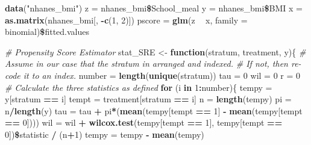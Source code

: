 \documentclass[]{article}
\newenvironment{Shaded}{\begin{snugshade}}{\end{snugshade}}
\newcommand{\KeywordTok}[1]{\textcolor[rgb]{0.13,0.29,0.53}{\textbf{#1}}}
\newcommand{\DataTypeTok}[1]{\textcolor[rgb]{0.13,0.29,0.53}{#1}}
\newcommand{\DecValTok}[1]{\textcolor[rgb]{0.00,0.00,0.81}{#1}}
\newcommand{\StringTok}[1]{\textcolor[rgb]{0.31,0.60,0.02}{#1}}
\newcommand{\CommentTok}[1]{\textcolor[rgb]{0.56,0.35,0.01}{\textit{#1}}}
\newcommand{\ControlFlowTok}[1]{\textcolor[rgb]{0.13,0.29,0.53}{\textbf{#1}}}
\newcommand{\OperatorTok}[1]{\textcolor[rgb]{0.81,0.36,0.00}{\textbf{#1}}}
\newcommand{\NormalTok}[1]{#1}
\begin{document}
\begin{Shaded}
\begin{Highlighting}[]
\KeywordTok{data}\NormalTok{(}\StringTok{"nhanes_bmi"}\NormalTok{)}
\NormalTok{z =}\StringTok{ }\NormalTok{nhanes_bmi}\OperatorTok{\$}\NormalTok{School_meal}
\NormalTok{y =}\StringTok{ }\NormalTok{nhanes_bmi}\OperatorTok{\$}\NormalTok{BMI}
\NormalTok{x =}\StringTok{ }\KeywordTok{as.matrix}\NormalTok{(nhanes_bmi[, }\OperatorTok{-}\KeywordTok{c}\NormalTok{(}\DecValTok{1}\NormalTok{, }\DecValTok{2}\NormalTok{)])}
\NormalTok{pscore =}\StringTok{ }\KeywordTok{glm}\NormalTok{(z }\OperatorTok{~}\StringTok{ }\NormalTok{x, }\DataTypeTok{family =}\NormalTok{ binomial)}\OperatorTok{\$}\NormalTok{fitted.values}

\CommentTok{# Propensity Score Estimator}
\NormalTok{stat_SRE <-}\StringTok{ }\ControlFlowTok{function}\NormalTok{(stratum, treatment, y)\{}
  \CommentTok{# Assume in our case that the stratum in arranged and indexed.}
  \CommentTok{# If not, then re-code it to an index.}
\NormalTok{  number =}\StringTok{ }\KeywordTok{length}\NormalTok{(}\KeywordTok{unique}\NormalTok{(stratum))}
\NormalTok{  tau =}\StringTok{ }\DecValTok{0}
\NormalTok{  wil =}\StringTok{ }\DecValTok{0}
\NormalTok{  r =}\StringTok{ }\DecValTok{0}
  \CommentTok{# Calculate the three statistics as defined}
  \ControlFlowTok{for}\NormalTok{ (i }\ControlFlowTok{in} \DecValTok{1}\OperatorTok{:}\NormalTok{number)\{}
\NormalTok{    tempy =}\StringTok{ }\NormalTok{y[stratum }\OperatorTok{==}\StringTok{ }\NormalTok{i]}
\NormalTok{    tempt =}\StringTok{ }\NormalTok{treatment[stratum }\OperatorTok{==}\StringTok{ }\NormalTok{i]}
\NormalTok{    n =}\StringTok{ }\KeywordTok{length}\NormalTok{(tempy)}
\NormalTok{    pi =}\StringTok{ }\NormalTok{n}\OperatorTok{/}\KeywordTok{length}\NormalTok{(y)}
\NormalTok{    tau =}\StringTok{ }\NormalTok{tau }\OperatorTok{+}\StringTok{ }\NormalTok{pi}\OperatorTok{*}\NormalTok{(}\KeywordTok{mean}\NormalTok{(tempy[tempt }\OperatorTok{==}\StringTok{ }\DecValTok{1}\NormalTok{] }\OperatorTok{-}\StringTok{ }\KeywordTok{mean}\NormalTok{(tempy[tempt }\OperatorTok{==}\StringTok{ }\DecValTok{0}\NormalTok{])))}
\NormalTok{    wil =}\StringTok{ }\NormalTok{wil }\OperatorTok{+}\StringTok{ }\KeywordTok{wilcox.test}\NormalTok{(tempy[tempt }\OperatorTok{==}\StringTok{ }\DecValTok{1}\NormalTok{], tempy[tempt }\OperatorTok{==}\StringTok{ }\DecValTok{0}\NormalTok{])}\OperatorTok{\$}\NormalTok{statistic }\OperatorTok{/}\StringTok{ }\NormalTok{(n}\OperatorTok{+}\DecValTok{1}\NormalTok{)}
\NormalTok{    tempy =}\StringTok{ }\NormalTok{tempy }\OperatorTok{-}\StringTok{ }\KeywordTok{mean}\NormalTok{(tempy)}

\end{Highlighting}
\end{Shaded}
\end{document}
